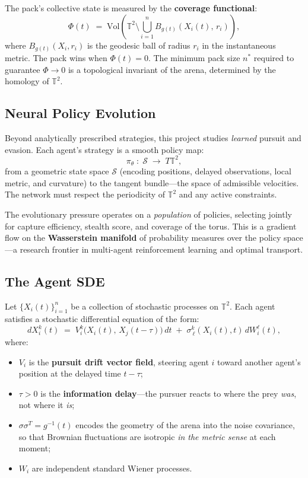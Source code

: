 The pack's collective state is measured by the \textbf{coverage functional}:
\[
  \Phi(t) \;=\; \mathrm{Vol}\!\left(
    \mathbb{T}^2 \setminus \bigcup_{i=1}^{n}
    B_{g(t)}\!\left(X_i(t),\, r_i\right)
  \right),
\]
where $B_{g(t)}(X_i, r_i)$ is the geodesic ball of radius $r_i$ in the
instantaneous metric. The pack wins when $\Phi(t) = 0$. The minimum pack
size $n^*$ required to guarantee $\Phi \to 0$ is a topological invariant
of the arena, determined by the homology of $\mathbb{T}^2$.

\subsection*{Neural Policy Evolution}

Beyond analytically prescribed strategies, this project studies \emph{learned}
pursuit and evasion. Each agent's strategy is a smooth policy map:
\[
  \pi_\theta \;:\; \mathcal{S} \;\longrightarrow\; T\mathbb{T}^2,
\]
from a geometric state space $\mathcal{S}$ (encoding positions, delayed
observations, local metric, and curvature) to the tangent bundle---the space
of admissible velocities. The network must respect the periodicity of
$\mathbb{T}^2$ and any active constraints.

The evolutionary pressure operates on a \emph{population} of policies,
selecting jointly for capture efficiency, stealth score, and coverage
of the torus. This is a gradient flow on the \textbf{Wasserstein manifold}
of probability measures over the policy space---a research frontier in
multi-agent reinforcement learning and optimal transport.

\subsection*{The Agent SDE}

Let $\{X_i(t)\}_{i=1}^{n}$ be a collection of stochastic processes on
$\mathbb{T}^2$. Each agent satisfies a stochastic differential equation of the
form:
\[
  dX_i^k(t) \;=\; V_i^k\!\bigl(X_i(t),\, X_j(t - \tau)\bigr)\,dt
  \;+\; \sigma^k_{\ \ell}(X_i(t), t)\,dW_i^\ell(t),
\]
where:
\begin{itemize}
  \item $V_i$ is the \textbf{pursuit drift vector field}, steering agent $i$
    toward another agent's position at the delayed time $t - \tau$;
  \item $\tau > 0$ is the \textbf{information delay}---the pursuer reacts to
    where the prey \emph{was}, not where it \emph{is};
  \item $\sigma \sigma^T = g^{-1}(t)$ encodes the geometry of the arena into
    the noise covariance, so that Brownian fluctuations are isotropic \emph{in
    the metric sense} at each moment;
  \item $W_i$ are independent standard Wiener processes.
\end{itemize}

